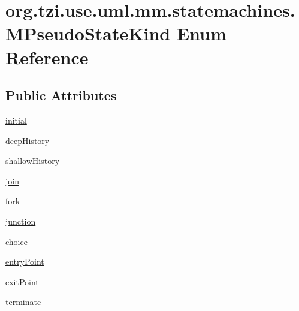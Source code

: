 \hypertarget{enumorg_1_1tzi_1_1use_1_1uml_1_1mm_1_1statemachines_1_1_m_pseudo_state_kind}{\section{org.\-tzi.\-use.\-uml.\-mm.\-statemachines.\-M\-Pseudo\-State\-Kind Enum Reference}
\label{enumorg_1_1tzi_1_1use_1_1uml_1_1mm_1_1statemachines_1_1_m_pseudo_state_kind}
}
\subsection*{Public Attributes}
\begin{DoxyCompactItemize}
\item 
\hyperlink{enumorg_1_1tzi_1_1use_1_1uml_1_1mm_1_1statemachines_1_1_m_pseudo_state_kind_a42dff4eeb6b82cadd299534ef165e3ae}{initial}
\item 
\hyperlink{enumorg_1_1tzi_1_1use_1_1uml_1_1mm_1_1statemachines_1_1_m_pseudo_state_kind_a65500e58e48cf9e5367e94367f60afbf}{deep\-History}
\item 
\hyperlink{enumorg_1_1tzi_1_1use_1_1uml_1_1mm_1_1statemachines_1_1_m_pseudo_state_kind_a0b7501e32466c844126ef2e87e743869}{shallow\-History}
\item 
\hyperlink{enumorg_1_1tzi_1_1use_1_1uml_1_1mm_1_1statemachines_1_1_m_pseudo_state_kind_af7bb36d796268c051e078534eec30007}{join}
\item 
\hyperlink{enumorg_1_1tzi_1_1use_1_1uml_1_1mm_1_1statemachines_1_1_m_pseudo_state_kind_afed463399d0651b5f464d461c7e34ffe}{fork}
\item 
\hyperlink{enumorg_1_1tzi_1_1use_1_1uml_1_1mm_1_1statemachines_1_1_m_pseudo_state_kind_a0f56e996f866b0fabb8fdda3b3dda53b}{junction}
\item 
\hyperlink{enumorg_1_1tzi_1_1use_1_1uml_1_1mm_1_1statemachines_1_1_m_pseudo_state_kind_a9f7b1db9a652d8d626a516783f41375e}{choice}
\item 
\hyperlink{enumorg_1_1tzi_1_1use_1_1uml_1_1mm_1_1statemachines_1_1_m_pseudo_state_kind_aa6d141ed9731e12040e396ed3cb41792}{entry\-Point}
\item 
\hyperlink{enumorg_1_1tzi_1_1use_1_1uml_1_1mm_1_1statemachines_1_1_m_pseudo_state_kind_a6cc083ad9282df0021da92fbbce9ea41}{exit\-Point}
\item 
\hyperlink{enumorg_1_1tzi_1_1use_1_1uml_1_1mm_1_1statemachines_1_1_m_pseudo_state_kind_afc970964dec0c9c8688448fb8ee0b6b8}{terminate}
\end{DoxyCompactItemize}


